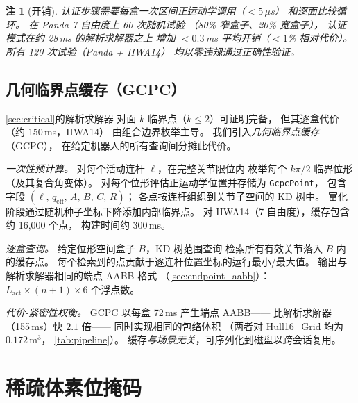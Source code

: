 \documentclass[journal]{IEEEtran}
\newtheorem{remark}{注}
\begin{document}
\begin{remark}[开销]
认证步骤需要每盒一次区间正运动学调用（$< 5\,\mu$s）
和逐面比较循环。
在 Panda 7 自由度上 60 次随机试验
（80\% 窄盒子、20\% 宽盒子），
认证模式在约 28\,ms 的解析求解器之上
增加 $< 0.3$\,ms 平均开销（$< 1$\% 相对代价）。
所有 120 次试验（Panda + IIWA14）
均以零违规通过正确性验证。
\end{remark}

\subsection{几何临界点缓存（GCPC）}\label{sec:gcpc}

\cref{sec:critical}的解析求解器
对面-$k$ 临界点（$k \leq 2$）可证明完备，
但其逐盒代价（约 150\,ms，IIWA14）
由组合边界枚举主导。
我们引入\emph{几何临界点缓存}（GCPC），
在给定机器人的所有查询间分摊此代价。

\emph{一次性预计算。}
对每个活动连杆 $\ell$，在完整关节限位内
枚举每个 $k\pi/2$ 临界位形（及其复合角变体）。
对每个位形评估正运动学位置并存储为 \texttt{GcpcPoint}，
包含字段 $(\ell,\, q_\text{eff},\, A,\, B,\, C,\, R)$；
各点按连杆组织到关节子空间的 KD 树中。
富化阶段通过随机种子坐标下降添加内部临界点。
对 IIWA14（7 自由度），缓存包含约 16,000 个点，
构建时间约 300\,ms。

\emph{逐盒查询。}
给定位形空间盒子 $B$，KD 树范围查询
检索所有有效关节落入 $B$ 内的缓存点。
每个检索到的点贡献于逐连杆位置坐标的运行最小/最大值。
输出与解析求解器相同的端点 AABB 格式
（\cref{sec:endpoint_aabb}）：
$L_\text{act} \times (n{+}1) \times 6$ 个浮点数。

\emph{代价-紧密性权衡。}
GCPC 以每盒 72\,ms 产生端点 AABB——
比解析求解器（155\,ms）快 $2.1$ 倍——
同时实现相同的包络体积
（两者对 Hull16\_Grid 均为 $0.172$\,m$^3$，
\cref{tab:pipeline}）。
缓存\emph{与场景无关}，可序列化到磁盘以跨会话复用。

\section{稀疏体素位掩码}\label{sec:voxel}

\end{document}
